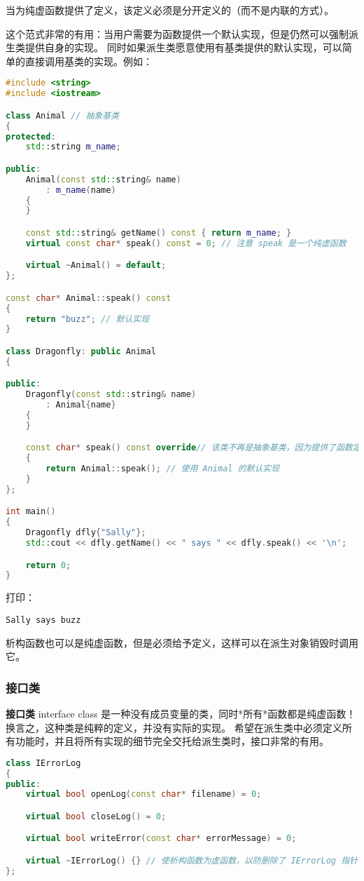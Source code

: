 \documentclass[../../LearnCpp.tex]{subfiles}
\begin{document}
当为纯虚函数提供了定义，该定义必须是分开定义的（而不是内联的方式）。

这个范式非常的有用：当用户需要为函数提供一个默认实现，但是仍然可以强制派生类提供自身的实现。
同时如果派生类愿意使用有基类提供的默认实现，可以简单的直接调用基类的实现。例如：

\begin{lstlisting}[language=C++]
#include <string>
#include <iostream>

class Animal // 抽象基类
{
protected:
    std::string m_name;

public:
    Animal(const std::string& name)
        : m_name(name)
    {
    }

    const std::string& getName() const { return m_name; }
    virtual const char* speak() const = 0; // 注意 speak 是一个纯虚函数

    virtual ~Animal() = default;
};

const char* Animal::speak() const
{
    return "buzz"; // 默认实现
}

class Dragonfly: public Animal
{

public:
    Dragonfly(const std::string& name)
        : Animal{name}
    {
    }

    const char* speak() const override// 该类不再是抽象基类，因为提供了函数定义
    {
        return Animal::speak(); // 使用 Animal 的默认实现
    }
};

int main()
{
    Dragonfly dfly{"Sally"};
    std::cout << dfly.getName() << " says " << dfly.speak() << '\n';

    return 0;
}
\end{lstlisting}

打印：

\begin{lstlisting}
Sally says buzz
\end{lstlisting}

析构函数也可以是纯虚函数，但是必须给予定义，这样可以在派生对象销毁时调用它。

\subsubsection*{接口类}

\textbf{接口类} interface class 是一种没有成员变量的类，同时*所有*函数都是纯虚函数！
换言之，这种类是纯粹的定义，并没有实际的实现。
希望在派生类中必须定义所有功能时，并且将所有实现的细节完全交托给派生类时，接口非常的有用。

\begin{lstlisting}[language=C++]
class IErrorLog
{
public:
    virtual bool openLog(const char* filename) = 0;

    virtual bool closeLog() = 0;

    virtual bool writeError(const char* errorMessage) = 0;

    virtual ~IErrorLog() {} // 使析构函数为虚函数，以防删除了 IErrorLog 指针
};
\end{lstlisting}
\end{document}
